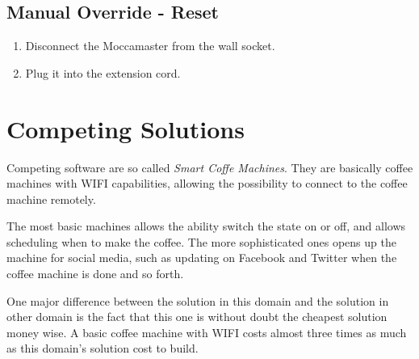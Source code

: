 \subsection{Manual Override - Reset}
\begin{enumerate}
\item Disconnect the Moccamaster from the wall socket.
\item Plug it into the extension cord.
\end{enumerate}

\section{Competing Solutions}

Competing software are so called \textit{Smart Coffe Machines}. They are basically coffee machines with WIFI capabilities, allowing the possibility to connect to the coffee machine remotely.

The most basic machines allows the ability switch the state on or off, and allows scheduling when to make the coffee. The more sophisticated ones opens up the machine for social media, such as updating on Facebook and Twitter when the coffee machine is done and so forth.

One major difference between the solution in this domain and the solution in other domain is the fact that this one is without doubt the cheapest solution money wise. A basic coffee machine with WIFI costs almost three times as much as this domain's solution cost to build.
